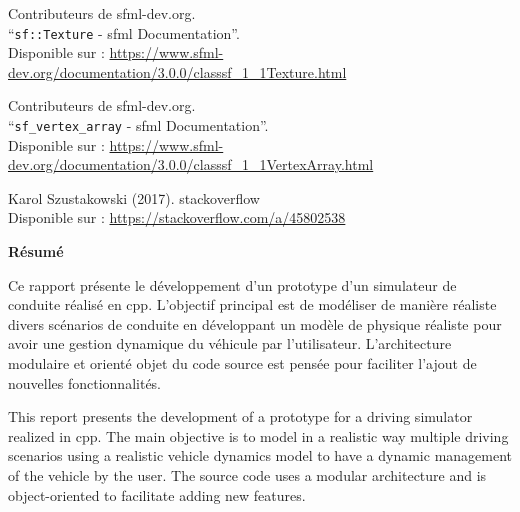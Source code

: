 \documentclass[a4paper,12pt]{report}
\begin{document}
\begin{thebibliography}{9}
        Contributeurs de sfml-dev.org.\\
        ``\texttt{sf::Texture} - \gls{sfml} Documentation''.\\
        Disponible sur : \url{https://www.sfml-dev.org/documentation/3.0.0/classsf_1_1Texture.html}

        Contributeurs de sfml-dev.org.\\
        ``\texttt{\gls{sf_vertex_array}} - \gls{sfml} Documentation''.\\
        Disponible sur : \url{https://www.sfml-dev.org/documentation/3.0.0/classsf_1_1VertexArray.html}

        Karol Szustakowski (2017).
        \gls{stackoverflow} \\
        Disponible sur : \url{https://stackoverflow.com/a/45802538}
    \end{thebibliography}

    \clearpage
    \vspace*{\fill}
    \begin{center}
    {\Large \textbf{Résumé}}
    \end{center}
    \bigskip
    \noindent
    \begin{minipage}{\textwidth}
        Ce rapport présente le développement d'un prototype d'un simulateur de conduite réalisé en \gls{cpp}.
        L'objectif principal est de modéliser de manière réaliste divers scénarios de conduite en développant un modèle de physique réaliste pour avoir une gestion dynamique du véhicule par l'utilisateur.
        L'architecture modulaire et orienté objet du code source est pensée pour faciliter l'ajout de nouvelles fonctionnalités.

        \bigskip

        This report presents the development of a prototype for a driving simulator realized in \gls{cpp}.
        The main objective is to model in a realistic way multiple driving scenarios using a realistic vehicle dynamics model to have a dynamic management of the vehicle by the user.
        The source code uses a modular architecture and is object-oriented to facilitate adding new features.
    \end{minipage}
    \vspace*{\fill} %
    \clearpage
\end{document}
